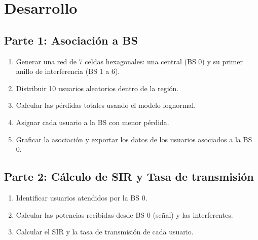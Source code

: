 \section{\Large Desarrollo}

\subsection*{Parte 1: Asociación a BS}
\begin{enumerate}
    \item Generar una red de 7 celdas hexagonales: una central (BS 0) y su primer anillo de interferencia (BS 1 a 6).
    \item Distribuir 10 usuarios aleatorios dentro de la región.
    \item Calcular las pérdidas totales usando el modelo lognormal.
    \item Asignar cada usuario a la BS con menor pérdida.
    \item Graficar la asociación y exportar los datos de los usuarios asociados a la BS 0.
\end{enumerate}

\subsection*{Parte 2: Cálculo de SIR y Tasa de transmisión}
\begin{enumerate}
    \item Identificar usuarios atendidos por la BS 0.
    \item Calcular las potencias recibidas desde BS 0 (señal) y las interferentes.
    \item Calcular el SIR y la tasa de transmisión de cada usuario.
\end{enumerate}
